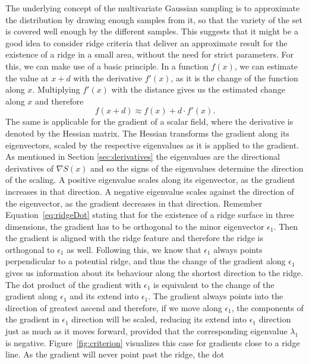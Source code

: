 The underlying concept of the multivariate Gaussian sampling is to
approximate the distribution by drawing enough samples from it, so that
the variety of the set is covered well enough by the different samples.
This suggests that it might be a good idea to consider ridge criteria
that deliver an approximate result for the existence of a ridge in a
small area, without the need for strict parameters. For this, we can make
use of a basic principle. In a function $f(x)$, we can estimate the value
at $x + d$ with the derivative $f'(x)$, as it is the change of the
function along $x$. Multiplying $f'(x)$ with the distance gives us the
estimated change along $x$ and therefore
\begin{equation}
    f(x + d) \approx f(x) + d \cdot f'(x).
\end{equation}
The same is applicable for the gradient of a scalar field, where the
derivative is denoted by the Hessian matrix. The Hessian transforms the
gradient along its eigenvectors, scaled by the respective eigenvalues as
it is applied to the gradient. As mentioned in Section
\ref{sec:derivatives} the eigenvalues are the directional derivatives of
$\nabla S(x)$ and so the signs of the eigenvalues determine the direction
of the scaling. A positive eigenvalue scales along its eigenvector, as
the gradient increases in that direction. A negative eigenvalue scales
against the direction of the eigenvector, as the gradient decreases in
that direction. Remember Equation~\ref{eq:ridgeDot} stating that for
the existence of a ridge surface in three dimensions, the gradient has
to be orthogonal to the minor eigenvector $\epsilon_1$. Then the
gradient is aligned with the ridge feature and therefore the ridge is
orthogonal to $\epsilon_1$ as well. Following this, we know that
$\epsilon_1$ always points perpendicular to a potential ridge, and thus
the change of the gradient along $\epsilon_1$ gives us information about
its behaviour along the shortest direction to the ridge. The dot product
of the gradient with $\epsilon_1$ is equivalent to the change of the
gradient along $\epsilon_1$ and its extend into $\epsilon_1$. The
gradient always points into the direction of greatest ascend and
therefore, if we move along $\epsilon_1$, the components of the gradient
in $\epsilon_1$ direction will be scaled, reducing its extend into
$\epsilon_1$ direction just as much as it moves forward, provided that
the corresponding eigenvalue $\lambda_1$ is negative.
Figure~\ref{fig:criterion} visualizes this case for gradients close to a
ridge line. As the gradient will never point past the ridge, the dot
